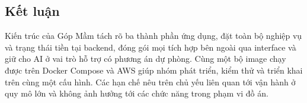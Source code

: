 \subsection{Kết luận}

Kiến trúc của Góp Mầm tách rõ ba thành phần ứng dụng, đặt toàn bộ nghiệp vụ và trạng thái tiền tại backend, đóng gói mọi tích hợp bên ngoài qua interface và giữ cho AI ở vai trò hỗ trợ có phương án dự phòng. Cùng một bộ image chạy được trên Docker Compose và AWS giúp nhóm phát triển, kiểm thử và triển khai trên cùng một cấu hình. Các hạn chế nêu trên chủ yếu liên quan tới vận hành ở quy mô lớn và không ảnh hưởng tới các chức năng trong phạm vi đồ án.
